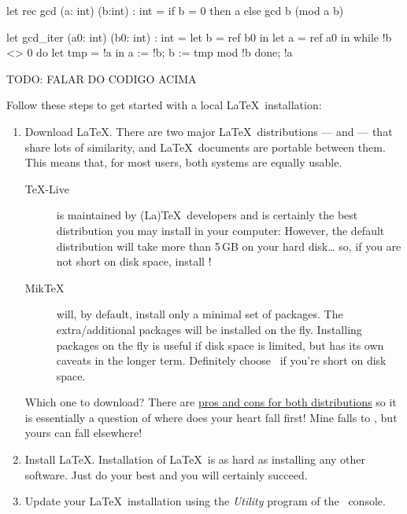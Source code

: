 {\begin{ocamlsmall}
  let rec gcd (a: int) (b:int) : int =
      if b = 0 then a
      else gcd b (mod a b) 
\end{ocamlsmall}

\begin{ocamlsmall}
  let gcd_iter (a0: int) (b0: int) : int =
      let b = ref b0 in
      let a = ref a0 in
      while !b <> 0 do
          let tmp = !a in
          a := !b;
          b := tmp mod !b
      done;
      !a
\end{ocamlsmall}

TODO: FALAR DO CODIGO ACIMA

\iffalse
Follow these steps to get started with a local \LaTeX\ installation:

\begin{enumerate}
  \item Download \LaTeX.  There are two major \LaTeX\ distributions — \href{https://miktex.org/}{\MikTeX} and \href{https://www.tug.org/texlive/}{\TeXLive} — that share lots of similarity, and \LaTeX\ documents are portable between them. This means that, for most users, both systems are equally usable.
  \begin{description}
    \item [\TeX-Live] is maintained by (La)\TeX\ developers and is certainly the best distribution you may install in your computer:  However, the default distribution will take more than 5\,GB on your hard disk… so, if you are not short on disk space, install \TeXLive!
    \item[Mik\TeX] will, by default, install only a minimal set of packages. The extra/additional packages will be installed on the fly.  Installing packages on the fly is useful if disk space is limited, but has its own caveats in the longer term.  Definitely choose \MikTeX\ if you're short on disk space.
  \end{description}
  Which one to download?  There are \href{https://tex.stackexchange.com/questions/20036/what-are-the-advantages-of-tex-live-over-miktex}{pros and cons for both distributions} so it is essentially a question of where does your heart fall first!  Mine falls to \TeXLive, but yours can fall elsewhere!  \emojiSmile
  \item Install \LaTeX. Installation of \LaTeX\ is as hard as installing any other software.  Just do your best and you will certainly succeed. 
  \item Update your \LaTeX\ installation using the \emph{\TeXLive Utility} program of the \MikTeX\ console.

\end{enumerate}}
